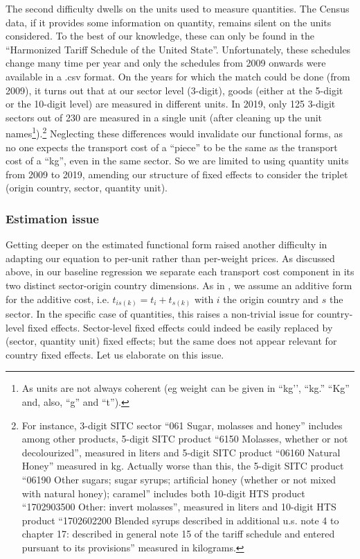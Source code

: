 \documentclass[a4paper,11pt]{article}
\begin{document}
The second difficulty dwells on the units used to measure quantities. The Census data, if it provides some information on quantity, remains silent on the units considered. To the best of our knowledge, these can only be found in the ``Harmonized Tariff Schedule of the United State''. Unfortunately, these schedules change many time per year and only the schedules from 2009 onwards were available in a .csv format. On the years for which the match could be done (from 2009), it turns out that at our sector level (3-digit), goods (either at the 5-digit or the 10-digit level) are measured in different units. In 2019, only 125 3-digit sectors out of 230 are measured in a single unit (after cleaning up the unit names\footnote{As units are not always coherent (eg weight can be given in ``kg’’, ``kg.'' ``Kg'' and, also, ``g'' and ``t'').}).\footnote{For instance, 3-digit SITC sector ``061 Sugar, molasses and honey'' includes among other products, 5-digit SITC product ``6150 Molasses, whether or not decolourized'', measured in liters and 5-digit SITC product ``06160 Natural Honey'' measured in kg. Actually worse than this, the 5-digit SITC product ``06190 Other sugars; sugar syrups; artificial honey (whether or not mixed with natural honey); caramel'' includes both 10-digit HTS product ``1702903500 Other: invert molasses'', measured in liters and 10-digit HTS product ``1702602200 Blended syrups described in additional u.s. note 4 to chapter 17: described in general note 15 of the tariff schedule and entered pursuant to its provisions''  measured in kilograms.} Neglecting these differences would invalidate our functional forms, as no one expects the transport cost of a ``piece'' to be the same as the transport cost of a ``kg'', even in the same sector.
So we are limited to using quantity units from 2009 to 2019, amending our structure of fixed effects to consider the triplet (origin country, sector, quantity unit).

\subsubsection{Estimation issue}

Getting deeper on the estimated functional form raised another difficulty in adapting our equation to per-unit rather than per-weight prices. As discussed above, in our baseline regression we separate each transport cost component in its two distinct sector-origin country dimensions. As in \cite{Irrazabal_2015}, we assume an additive form for the additive cost, i.e. $t_{is(k)} = t_i+t_{s(k)}$ with $i$ the origin country and $s$ the sector. In the specific case of quantities, this raises a non-trivial issue for country-level fixed effects. Sector-level fixed effects could indeed be easily replaced by (sector, quantity unit) fixed effects; but the same does not appear relevant for country fixed effects. Let us elaborate on this issue.
\end{document}

